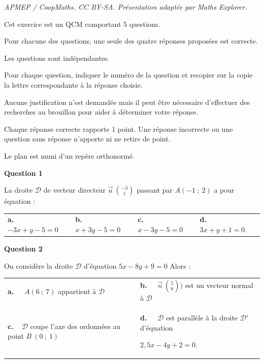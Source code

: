 \documentclass[10pt]{article}
\providecommand{\vv}[1]{\overrightarrow{#1}}
\providecommand{\vv}[1]{{\overrightarrow{#1}}}
\begin{document}
\noindent\textit{APMEP / CoopMaths. CC BY-SA. Présentation adaptée par Maths Explorer.}\par\medskip
\medskip

Cet exercice est un QCM comportant 5 questions. 

Pour chacune des questions, une seule des quatre réponses proposées est correcte. 

Les questions sont indépendantes.

Pour chaque question, indiquer le numéro de la question et recopier sur la copie la lettre correspondante à la réponse choisie.

Aucune justification n'est demandée mais il peut être nécessaire d'effectuer des recherches au brouillon pour aider à déterminer votre réponse.

Chaque réponse correcte rapporte 1 point. Une réponse incorrecte ou une question sans réponse n'apporte ni ne retire de point.

\bigskip

Le plan est muni d'un repère orthonormé.

\medskip

\textbf{Question 1}

\medskip 

La droite $\mathcal{D}$ de vecteur directeur $\vv{u}\ \binom{-3}{1}$ passant par $A(-1~;~2)$ a pour équation :

\medskip

\begin{tabularx}{\linewidth}{*{4}{X}}
\textbf{a.~~} $-3x+y-5=0 $ &\textbf{b.~~} $x+3y-5=0 $&\textbf{c.~~} $x-3y-5=0 $& \textbf{d.~~} $3x+y+1=0  $.
\end{tabularx}

\medskip

\textbf{Question 2}

\medskip 

On considère la droite $\mathcal{D}$ d'équation $5x-8y+9=0$ Alors :

\medskip

\begin{tabularx}{\linewidth}{*{2}{X}}
\textbf{a.~~} $ A(6~;~7) $ appartient à $\mathcal{D}$ &\textbf{b.~~} $\vv{n}\ \binom{5}{8})$ est un vecteur normal à $\mathcal{D}$ \\
\textbf{c.~~}$\mathcal{D}$ coupe l'axe des ordonnées au point $B\ (0~;~1) $& \textbf{d.~~} $\mathcal{D}$ est parallèle à la droite $\mathcal{D}'$ d'équation 

$2,5x - 4y + 2 = 0$.
\end{tabularx}
\end{document}
